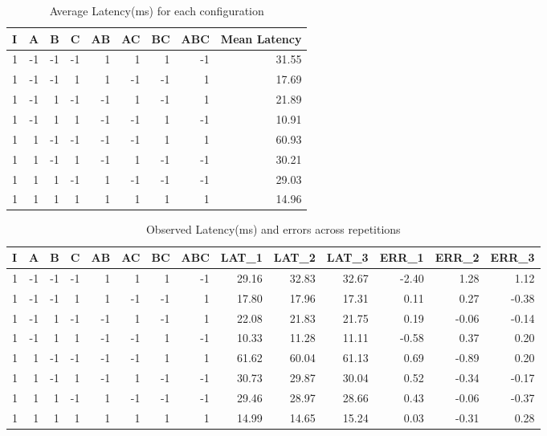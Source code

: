 \documentclass[11pt,a4paper]{article}
\begin{document}
\begin{table}[!htbp]
	\caption{Average Latency(ms) for each configuration}
	\centering
	\begin{tabular}{|r|r|r|r|r|r|r|r|r|}
		\hline
		\multicolumn{1}{|l|}{I} & \multicolumn{1}{|l|}{A} & \multicolumn{1}{l|}{B} & \multicolumn{1}{l|}{C} & \multicolumn{1}{l|}{AB} & \multicolumn{1}{l|}{AC} & \multicolumn{1}{l|}{BC} & \multicolumn{1}{l|}{ABC} & \multicolumn{1}{l|}{Mean Latency} \\ \hline
		1 & -1 & -1 & -1 & 1 & 1 & 1 & -1 & 31.55 \\ \hline
		1 & -1 & -1 & 1 & 1 & -1 & -1 & 1 & 17.69 \\ \hline
		1 & -1 & 1 & -1 & -1 & 1 & -1 & 1 & 21.89 \\ \hline
		1 & -1 & 1 & 1 & -1 & -1 & 1 & -1 & 10.91 \\ \hline
		1 & 1 & -1 & -1 & -1 & -1 & 1 & 1 & 60.93 \\ \hline
		1 & 1 & -1 & 1 & -1 & 1 & -1 & -1 & 30.21 \\ \hline
		1 & 1 & 1 & -1 & 1 & -1 & -1 & -1 & 29.03 \\ \hline
		1 & 1 & 1 & 1 & 1 & 1 & 1 & 1 & 14.96 \\ \hline
	\end{tabular}
	\label{}
\end{table}


\begin{table}[H]
	\caption{Observed Latency(ms) and errors across repetitions}
	\begin{tabular}{|r|r|r|r|r|r|r|r|r|r|r|r|r|r|}
		\hline
		\multicolumn{1}{|l|}{I} & \multicolumn{1}{l|}{A} & \multicolumn{1}{l|}{B} & \multicolumn{1}{l|}{C} & \multicolumn{1}{l|}{AB} & \multicolumn{1}{l|}{AC} & \multicolumn{1}{l|}{BC} & \multicolumn{1}{l|}{ABC} & \multicolumn{1}{l|}{LAT\_1} & \multicolumn{1}{l|}{LAT\_2} & \multicolumn{1}{l|}{LAT\_3} & \multicolumn{1}{l|}{ERR\_1} & \multicolumn{1}{l|}{ERR\_2} & \multicolumn{1}{l|}{ERR\_3} \\ \hline
		1 & -1 & -1 & -1 & 1 & 1 & 1 & -1 & 29.16 & 32.83 & 32.67 & -2.40 & 1.28 & 1.12 \\ \hline
		1 & -1 & -1 & 1 & 1 & -1 & -1 & 1 & 17.80 & 17.96 & 17.31 & 0.11 & 0.27 & -0.38 \\ \hline
		1 & -1 & 1 & -1 & -1 & 1 & -1 & 1 & 22.08 & 21.83 & 21.75 & 0.19 & -0.06 & -0.14 \\ \hline
		1 & -1 & 1 & 1 & -1 & -1 & 1 & -1 & 10.33 & 11.28 & 11.11 & -0.58 & 0.37 & 0.20 \\ \hline
		1 & 1 & -1 & -1 & -1 & -1 & 1 & 1 & 61.62 & 60.04 & 61.13 & 0.69 & -0.89 & 0.20 \\ \hline
		1 & 1 & -1 & 1 & -1 & 1 & -1 & -1 & 30.73 & 29.87 & 30.04 & 0.52 & -0.34 & -0.17 \\ \hline
		1 & 1 & 1 & -1 & 1 & -1 & -1 & -1 & 29.46 & 28.97 & 28.66 & 0.43 & -0.06 & -0.37 \\ \hline
		1 & 1 & 1 & 1 & 1 & 1 & 1 & 1 & 14.99 & 14.65 & 15.24 & 0.03 & -0.31 & 0.28 \\ \hline
	\end{tabular}
	\label{}
\end{table}
\end{document}
